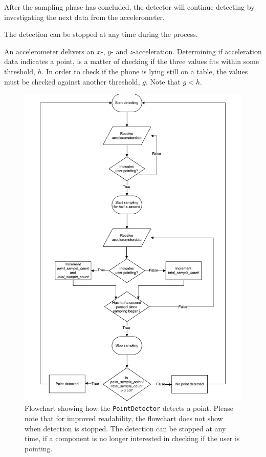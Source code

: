 After the sampling phase has concluded, the detector will continue detecting by investigating the next
data from the accelerometer.

The detection can be stopped at any time during the process.

An accelerometer delivers an $x$-, $y$- and $z$-acceleration. 
Determining if acceleration data indicates a point, 
is a matter of checking if the three values fits within some threshold, $h$. 
In order to check if the phone is lying still on a table, 
the values must be checked against another threshold, $g$. Note that $g < h$.

\begin{figure}
\centering
\includegraphics[height=0.85\textheight]{images/point-detector-flow-chart}
\caption{Flowchart showing how the \texttt{PointDetector} detects a point. Please note that for improved readability, the flowchart does not show when detection is stopped. The detection can be stopped at any time, if a component is no longer interested in checking if the user is pointing.}
\label{fig:pointdetector-flow-chart}
\end{figure}

